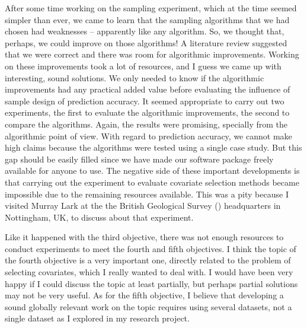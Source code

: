 After some time working on the sampling experiment, which at the time seemed simpler than ever, we came to 
learn that the sampling algorithms that we had chosen had weaknesses -- apparently like any algorithm. So, we 
thought that, perhaps, we could improve on those algorithms! A literature review suggested that we were correct 
and there was room for algorithmic improvements. Working on these improvements took a lot of resources, and I 
guess we came up with interesting, sound solutions. We only needed to know if the algorithmic improvements had 
any practical added value before evaluating the influence of sample design of prediction accuracy. It 
seemed appropriate to carry out two experiments, the first to evaluate the algorithmic improvements, the second 
to compare the algorithms. Again, the results were promising, specially from the algorithmic point of view. 
With regard to prediction accuracy, we cannot make high claims because the algorithms were tested using a 
single case study. But this gap should be easily filled since we have made our software package freely 
available for anyone to use. The negative side of these important developments is that carrying out the 
experiment to evaluate covariate selection methods became impossible due to the remaining resources available. 
This was a pity because I visited Murray Lark at the the British Geological Survey (\bgs) headquarters in 
Nottingham, UK, to discuss about that experiment.

Like it happened with the third objective, there was not enough resources to conduct experiments to meet the 
fourth and fifth objectives. I think the topic of the fourth objective is a very important one, directly 
related to the problem of selecting covariates, which I really wanted to deal with. I would 
have been very happy if I could discuss the topic at least partially, but perhaps partial solutions may not be 
very useful. As for the fifth objective, I believe that developing a sound globally relevant work on the topic 
requires using several datasets, not a single dataset as I explored in my research project.

